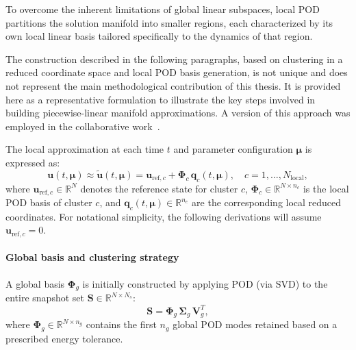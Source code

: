To overcome the inherent limitations of global linear subspaces, local POD partitions the solution manifold into smaller regions, each characterized by its own local linear basis tailored specifically to the dynamics of that region.

 The construction described in the following paragraphs, based on clustering in a reduced coordinate space and local POD basis generation, is not unique and does not represent the main methodological contribution of this thesis. It is provided here as a representative formulation to illustrate the key steps involved in building piecewise-linear manifold approximations. A version of this approach was employed in the collaborative work~\cite{bravo2024subspace}.


The local approximation at each time $t$ and parameter configuration $\boldsymbol{\mu}$ is expressed as:
\begin{equation}
\mathbf{u}(t,\boldsymbol{\mu}) \approx \mathbf{\tilde{u}}(t,\boldsymbol{\mu}) 
= \mathbf{u}_{\text{ref},c} + \boldsymbol{\Phi}_c \, \mathbf{q}_c(t,\boldsymbol{\mu}), 
\quad c = 1, \dotsc, N_{\text{local}},
\label{eq:local_pod_approximation}
\end{equation}
where $\mathbf{u}_{\text{ref},c} \in \mathbb{R}^{N}$ denotes the reference state for cluster $c$, 
$\boldsymbol{\Phi}_c \in \mathbb{R}^{N\times n_c}$ is the local POD basis of cluster $c$, 
and $\mathbf{q}_c(t,\boldsymbol{\mu}) \in \mathbb{R}^{n_c}$ are the corresponding local reduced coordinates. 
For notational simplicity, the following derivations will assume $\mathbf{u}_{\text{ref},c}=0$.




\paragraph{Global basis and clustering strategy} 
A global basis \(\boldsymbol{\Phi}_{g}\) is initially constructed by applying POD (via SVD) to the entire snapshot set \(\mathbf{S}\in\mathbb{R}^{N\times N_s}\):
\begin{equation}
\mathbf{S} = \boldsymbol{\Phi}_{g}\,\boldsymbol{\Sigma}_{g}\,\mathbf{V}_{g}^T,
\label{eq:global_svd}
\end{equation}
where \(\boldsymbol{\Phi}_{g}\in\mathbb{R}^{N\times n_g}\) contains the first \(n_g\) global POD modes retained based on a prescribed energy tolerance.

